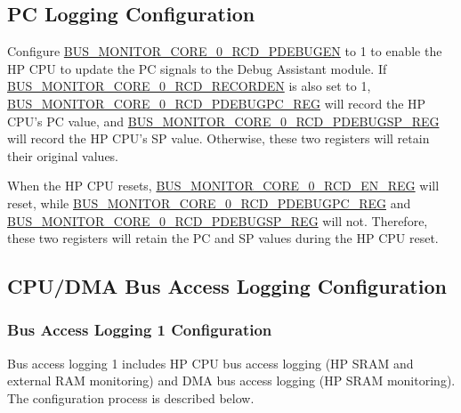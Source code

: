 \documentclass[main\_\_EN.tex]{subfiles}
\begin{document}
\subsection{PC Logging Configuration}

Configure \hyperref[fielddesc:BUSMONITORCORE0RCDPDEBUGEN]{BUS\_MONITOR\_CORE\_0\_RCD\_PDEBUGEN} to 1 to enable the HP CPU to update the PC signals to the Debug Assistant module. If \hyperref[fielddesc:BUSMONITORCORE0RCDRECORDEN]{BUS\_MONITOR\_CORE\_0\_RCD\_RECORDEN} is also set to 1, \hyperref[regdesc:BUSMONITORCORE0RCDPDEBUGPCREG]{BUS\_MONITOR\_CORE\_0\_RCD\_PDEBUGPC\_REG} will record the HP CPU's PC value, and \hyperref[regdesc:BUSMONITORCORE0RCDPDEBUGSPREG]{BUS\_MONITOR\_CORE\_0\_RCD\_PDEBUGSP\_REG} will record the HP CPU's SP value. Otherwise, these two registers will retain their original values.

When the HP CPU resets, \hyperref[regdesc:BUSMONITORCORE0RCDENREG]{BUS\_MONITOR\_CORE\_0\_RCD\_EN\_REG} will reset, while \hyperref[regdesc:BUSMONITORCORE0RCDPDEBUGPCREG]{BUS\_MONITOR\_CORE\_0\_RCD\_PDEBUGPC\_REG} and \hyperref[regdesc:BUSMONITORCORE0RCDPDEBUGSPREG]{BUS\_MONITOR\_CORE\_0\_RCD\_PDEBUGSP\_REG} will not. Therefore, these two registers will retain the PC and SP values during the HP CPU reset.

\subsection{CPU/DMA Bus Access Logging Configuration}

\subsubsection{Bus Access Logging 1 Configuration}
\label{sec:hp-cpu-access-mon}

Bus access logging 1 includes HP CPU bus access logging (HP SRAM and external RAM monitoring) and DMA bus access logging (HP SRAM monitoring). The configuration process is described below.
\end{document}
